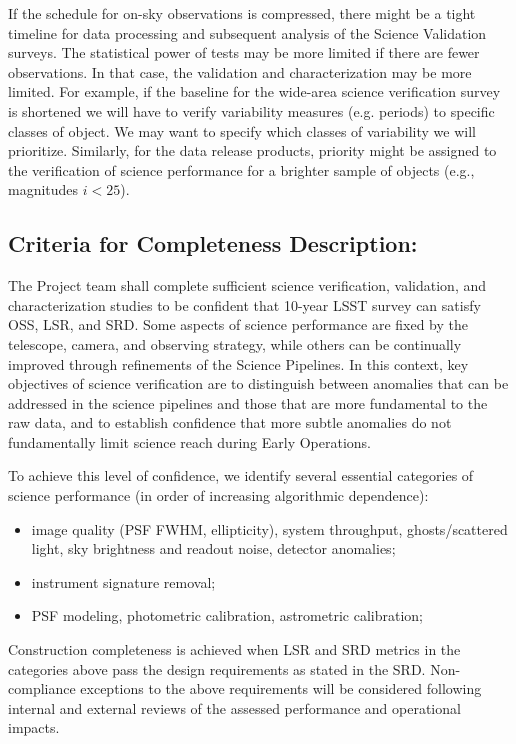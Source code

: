 If the schedule for on-sky observations is compressed, there might be a tight timeline for data processing and subsequent analysis of the Science Validation surveys. The statistical power of tests may be more limited if there are fewer observations. In that case, the validation and characterization may be more limited. For example, if the baseline for the wide-area science verification survey is shortened we will have to verify variability measures (e.g. periods) to specific classes of object. We may want to specify which classes of variability we will prioritize. Similarly, for the data release products, priority might be assigned to the verification of science performance for a brighter sample of objects (e.g., magnitudes $i < 25$).

\subsection{Criteria for Completeness Description:}

The Project team shall complete sufficient science verification, validation, and characterization studies to be confident that 10-year LSST survey can satisfy OSS, LSR, and SRD. Some aspects of science performance are fixed by the telescope, camera, and observing strategy, while others can be continually improved through refinements of the Science Pipelines. In this context, key objectives of science verification are to distinguish between anomalies that can be addressed in the science pipelines and those that are more fundamental to the raw data, and to establish confidence that more subtle anomalies do not fundamentally limit science reach during Early Operations.

To achieve this level of confidence, we identify several essential categories of science performance (in order of increasing algorithmic dependence):

\begin{itemize}
\item image quality (PSF FWHM, ellipticity), system throughput, ghosts/scattered light, sky brightness and readout noise, detector anomalies;
\item instrument signature removal;
\item PSF modeling, photometric calibration, astrometric calibration;
\end{itemize}

Construction completeness is achieved when LSR and SRD metrics in the categories above pass the design requirements as stated in the SRD. Non-compliance exceptions to the above requirements will be considered following internal and external reviews of the assessed performance and operational impacts.

